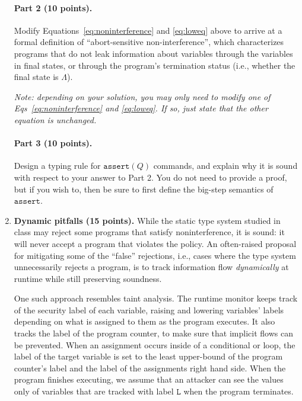 \documentclass[10pt]{article}
\begin{document}
\begin{enumerate}

\newpage

\paragraph{Part 2 (10 points).}
Modify Equations~\ref{eq:noninterference} and \ref{eq:loweq} above to arrive at a formal definition of ``abort-sensitive non-interference'', which characterizes programs that do not leak information about \hisec variables through the \lowsec variables in final states, or through the program's termination status (i.e., whether the final state is $\Lambda$).

\noindent
\emph{Note: depending on your solution, you may only need to modify one of Eqs~\ref{eq:noninterference} and \ref{eq:loweq}. If so, just state that the other equation is unchanged.}



\vspace*{25em}

\paragraph{Part 3 (10 points).}
Design a typing rule for $\mathtt{assert}(Q)$ commands, and explain why it is sound with respect to your answer to Part 2. You do not need to provide a proof, but if you wish to, then be sure to first define the big-step semantics of $\mathtt{assert}$.


\newpage

\item \textbf{Dynamic pitfalls (15 points).}
While the static type system studied in class may reject some programs that satisfy noninterference, it is sound: it will never accept a program that violates the policy.
An often-raised proposal for mitigating some of the ``false'' rejections, i.e., cases where the type system unnecessarily rejects a program, is to track information flow \emph{dynamically} at runtime while still preserving soundness.

One such approach resembles taint analysis.
The runtime monitor keeps track of the security label of each variable, raising and lowering variables' labels depending on what is assigned to them as the program executes.
It also tracks the label of the program counter, to make sure that implicit flows can be prevented.
When an assignment occurs inside of a conditional or loop, the label of the target variable is set to the least upper-bound of the program counter's label and the label of the assignments right hand side.
When the program finishes executing, we assume that an attacker can see the values only of variables that are tracked with label $\mathtt{L}$ when the program terminates.


\end{enumerate}
\end{document}
